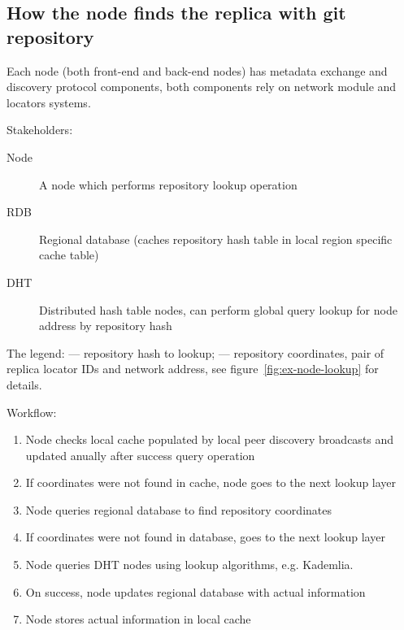 \subsection{How the node finds the replica with git repository}

Each node (both front-end and back-end nodes) has metadata exchange and discovery protocol components,
both components rely on network module and locators systems.

Stakeholders:
\begin{description}
  \item[Node] A node which performs repository lookup operation
  \item[RDB] Regional database (caches repository hash table in local region specific cache table)
  \item[DHT] Distributed hash table nodes, can perform global query lookup for node address by repository hash
\end{description}

The legend:  --- repository hash to lookup;  --- repository coordinates,
pair of replica locator IDs and network address, see figure~\ref{fig:ex-node-lookup} for details.

Workflow:
\begin{enumerate}
    \item Node checks local cache populated by local peer discovery broadcasts
      and updated anually after success query operation
    \item If coordinates were not found in cache, node goes to the next lookup layer
    \item Node queries regional database to find repository coordinates
    \item If coordinates were not found in database, goes to the next lookup layer
    \item Node queries DHT nodes using lookup algorithms, e.g. Kademlia.
    \item On success, node updates regional database with actual information
    \item Node stores actual information in local cache
\end{enumerate}

